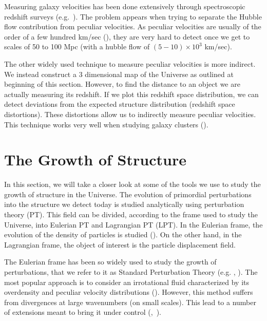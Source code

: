 Measuring galaxy velocities has been done extensively through spectroscopic redshift surveys (e.g.~\cite{2013AJ....145...10D}). The problem appears when trying to separate the Hubble flow contribution from peculiar velocities. As peculiar velocities are usually of the order of a few hundred km/sec (\cite{dodelson2003modern}), they are very hard to detect once we get to scales of 50 to 100 Mpc (with a hubble flow of $(5-10) \times 10^3$ km/sec). 

The other widely used technique to measure peculiar velocities is more indirect. We instead construct a 3 dimensional map of the Universe as outlined at beginning of this section. However, to find the distance to an object we are actually measuring its redshift. If we plot this redshift space distribution, we can detect deviations from the expected structure distribution (redshift space distortions). These distortions allow us to indirectly measure peculiar velocities. This technique works very well when studying galaxy clusters (\cite{dodelson2003modern}).

    
    

\section{The Growth of Structure}

In this section, we will take a closer look at some of the tools we use to study the growth of structure in the Universe. The evolution of primordial perturbations into the structure we detect today is studied analytically using perturbation theory (PT). This field can be divided, according to the frame used to study the Universe, into Eulerian PT and Lagrangian PT (LPT). In the Eulerian frame, the evolution of the density of particles is studied (\cite{Bernardeau_PT}). On the other hand, in the Lagrangian frame, the object of interest is the particle displacement field.

The Eulerian frame has been so widely used to study the growth of perturbations, that we refer to it as Standard Perturbation Theory (e.g. \cite{1983MNRAS.203..345V}, \cite{peebles1980large}). The most popular approach is to consider an irrotational fluid characterized by its overdensity and peculiar velocity distributions (\cite{Carlson_perturbation_theory}). However, this method suffers from divergences at large wavenumbers (on small scales). This lead to a number of extensions meant to bring it under control (\cite{2006PhRvD..73f3519C},~\cite{2008PhRvD..77b3533C}). 

